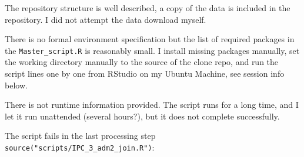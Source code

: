 \documentclass[
  a4paper,
]{article}
\begin{document}
The repository structure is well described, a copy of the data is
included in the repository. I did not attempt the data download myself.

There is no formal environment specification but the list of required
packages in the \texttt{Master\_script.R} is reasonably small. I install
missing packages manually, set the working directory manually to the
source of the clone repo, and run the script lines one by one from
RStudio on my Ubuntu Machine, see session info below.

There is not runtime information provided. The script runs for a long
time, and I let it run unattended (several hours?), but it does not
complete successfully.

The script fails in the last processing step
\texttt{source("scripts/IPC\_3\_adm2\_join.R")}:

\scriptsize
\end{document}
